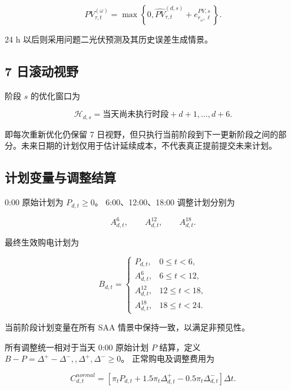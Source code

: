 \begin{equation}
PV^{(\omega)}_{\tau,t}
=
\max
\left\{
0,
\widehat{PV}^{(d,s)}_{\tau,t}
+
e^{PV,s}_{r_\omega,\ell}
\right\}.
\end{equation}

24 h 以后则采用问题二光伏预测及其历史误差生成情景。

\subsection{7 日滚动视野}

阶段 \(s\) 的优化窗口为

\begin{equation}
\mathcal H_{d,s}
=
\text{当天尚未执行时段}
+
d+1,\ldots,d+6.
\end{equation}

即每次重新优化仍保留 7 日视野，但只执行当前阶段到下一更新阶段之间的部分。未来日期的计划仅用于估计延续成本，不代表真正提前提交未来计划。

\subsection{计划变量与调整结算}

0:00 原始计划为 \(P_{d,t}\ge0\)。 6:00、12:00、18:00 调整计划分别为

\begin{equation}
A^6_{d,t},
\qquad
A^{12}_{d,t},
\qquad
A^{18}_{d,t}.
\end{equation}

最终生效购电计划为

\begin{equation}
B_{d,t}
=
\begin{cases}
P_{d,t},&0\le t<6,\\
A^6_{d,t},&6\le t<12,\\
A^{12}_{d,t},&12\le t<18,\\
A^{18}_{d,t},&18\le t<24.
\end{cases}
\end{equation}

当前阶段计划变量在所有 SAA 情景中保持一致，以满足非预见性。

所有调整统一相对于当天 0:00 原始计划 \(P\) 结算，定义 \(B-P=\Delta^+-\Delta^-,, \Delta^+,\Delta^-\ge0\)。 正常购电及调整费用为

\begin{equation}
C^{normal}_{d,t}
=
\left[
\pi_tP_{d,t}
+
1.5\pi_t\Delta^+_{d,t}
-
0.5\pi_t\Delta^-_{d,t}
\right]\Delta t.
\end{equation}


